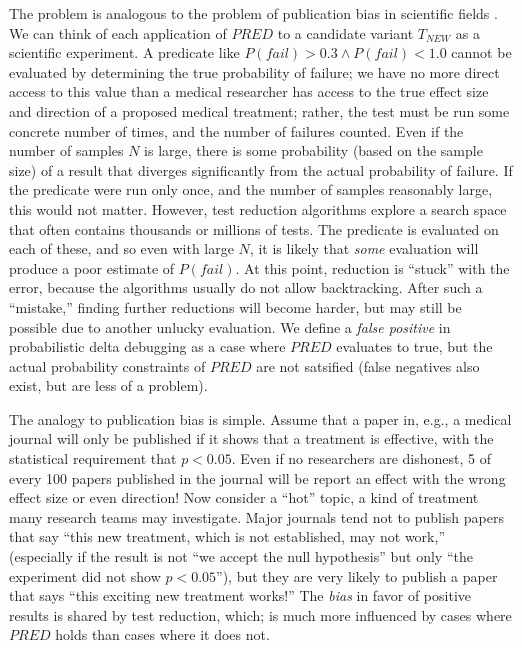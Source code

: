 The problem is analogous to the problem of publication bias in
scientific fields \cite{ahmed2012assessment}.  We can think of each
application of $\mathit{PRED}$ to a candidate variant
$T_{\mathit{NEW}}$ as a scientific experiment.  A predicate like
$P(\mathit{fail}) > 0.3 \wedge P(\mathit{fail}) < 1.0$ cannot be evaluated by
determining the true probability of failure; we have no more direct access to
this value than a medical researcher has access to the true effect
size and direction of a proposed medical treatment; rather, the test must be
run some concrete number of times, and the number of failures counted.
Even if the number of samples $N$ is large, there is some
probability (based on the sample size) of a result that diverges
significantly from the actual probability of failure.  If the
predicate were run only once, and the number of samples reasonably
large, this would not matter.  However, test reduction algorithms explore a search
space that often contains thousands or millions of
tests.  The predicate is evaluated on each of these, and so
even with large $N$, it is likely that \emph{some} evaluation will
produce a poor estimate of $P(\mathit{fail})$.  At this point, reduction is
``stuck'' with the error, because the
algorithms usually do not allow backtracking.  After such a ``mistake,'' finding further
reductions will become harder, but may still be possible due to
another unlucky evaluation.  We define a \emph{false positive} in probabilistic
delta debugging as a case where $\mathit{PRED}$ evaluates to true, but
the actual probability constraints of $\mathit{PRED}$ are not
satsified (false negatives
also exist, but are less of a problem).

The analogy to publication bias is simple.  Assume that a paper in,
e.g., a medical journal will only be published if it shows that a
treatment is effective, with the statistical requirement that $p <
0.05$.  Even if no researchers are dishonest, 5 of every 100 papers published
in the journal will be report an effect with the wrong effect size or
even direction!  Now consider a ``hot'' topic, a kind of
treatment many research teams may investigate.  Major journals tend
not to publish papers that say ``this new treatment, which is not
established, may not work,'' (especially if the result is not ``we
accept the null hypothesis'' but only ``the experiment did not
show $p < 0.05$''), but they  are very likely to publish a paper
that says ``this exciting new treatment works!'' 
The \emph{bias} in
favor of positive results is shared by test reduction, which;
is much more influenced by cases where
$\mathit{PRED}$ holds than cases where it does not.

